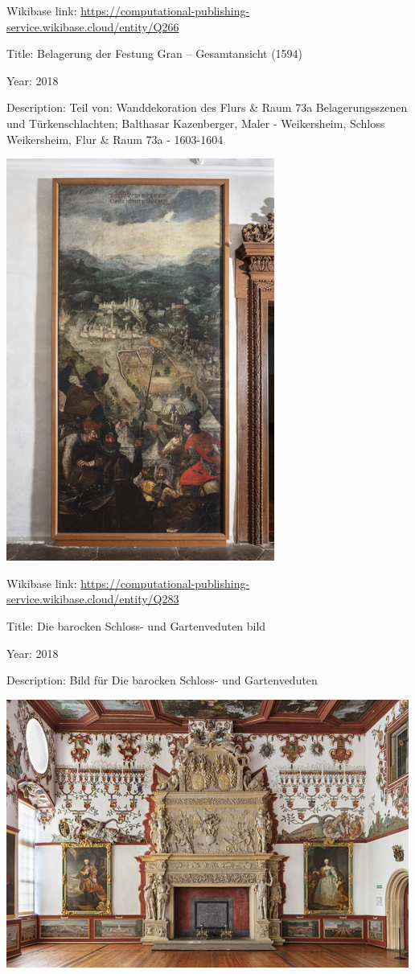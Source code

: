 \documentclass[
  letterpaper,
]{book}
\begin{document}
Wikibase link:
\url{https://computational-publishing-service.wikibase.cloud/entity/Q266}

Title: Belagerung der Festung Gran -- Gesamtansicht (1594)

Year: 2018

Description: Teil von: Wanddekoration des Flurs \& Raum 73a
Belagerungsszenen und Türkenschlachten; Balthasar Kazenberger, Maler -
Weikersheim, Schloss Weikersheim, Flur \& Raum 73a - 1603-1604

\includegraphics{paintings_files/figure-pdf/cell-3-output-46.png}

Wikibase link:
\url{https://computational-publishing-service.wikibase.cloud/entity/Q283}

Title: Die barocken Schloss- und Gartenveduten bild

Year: 2018

Description: Bild für Die barocken Schloss- und Gartenveduten

\includegraphics{paintings_files/figure-pdf/cell-3-output-48.png}
\end{document}

